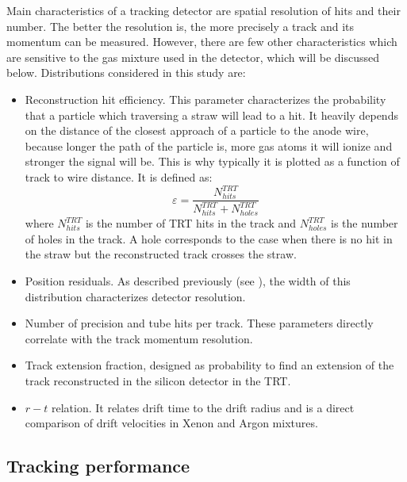 Main characteristics of a tracking detector are spatial resolution of hits and their number. 
The better the resolution is, the more precisely a track and its momentum can be measured.
However, there are few other characteristics which are sensitive to the gas mixture used in the detector, which will be discussed below.
Distributions considered in this study are:
\begin{itemize}
 \item Reconstruction hit efficiency. This parameter characterizes the probability that a particle which traversing a straw will lead to a hit.
 It heavily depends on the distance of the closest approach of a particle to the anode wire, because longer the path of the particle is, more gas atoms it will
 ionize and stronger the signal will be. This is why typically it is plotted as a function of track to wire distance. It is defined as:
 \begin{equation}
  \varepsilon = \dfrac{N^{TRT}_{hits}}{N^{TRT}_{hits} + N^{TRT}_{holes}}
 \label{eq:hit_eff}
 \end{equation}
 where $N^{TRT}_{hits}$ is the number of TRT hits in the track and $N^{TRT}_{holes}$ is the number of holes in the track. A hole corresponds to the case when there is no hit in the straw
 but the reconstructed track crosses the straw.
 \item Position residuals. As described previously (see ), the width of this distribution characterizes detector resolution.
 \item Number of precision and tube hits per track. These parameters directly correlate with the track momentum resolution.
 \item Track extension fraction, designed as probability to find an extension of the track reconstructed in the silicon detector in the TRT.
 \item $r-t$ relation. It relates drift time to the drift radius and is a direct comparison of drift velocities in Xenon and Argon mixtures.
\end{itemize}


\subsection{Tracking performance}
\label{subsec:TRT:trackPerf}

